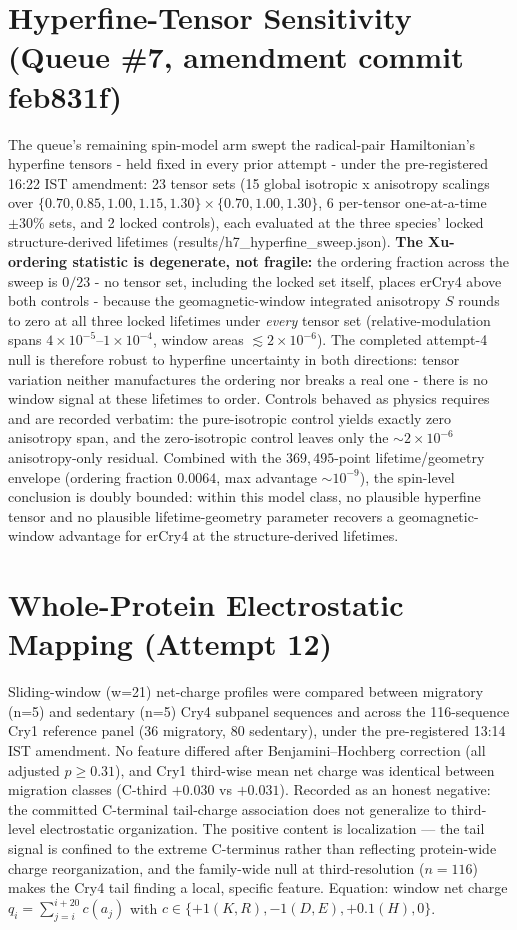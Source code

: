 \documentclass[12pt,a4paper]{article}
\begin{document}
\section{Hyperfine-Tensor Sensitivity (Queue \#7, amendment commit feb831f)}
The queue's remaining spin-model arm swept the radical-pair Hamiltonian's hyperfine tensors - held fixed in every prior attempt - under the pre-registered 16:22 IST amendment: 23 tensor sets (15 global isotropic x anisotropy scalings over $\{0.70, 0.85, 1.00, 1.15, 1.30\} \times \{0.70, 1.00, 1.30\}$, 6 per-tensor one-at-a-time $\pm 30\%$ sets, and 2 locked controls), each evaluated at the three species' locked structure-derived lifetimes (results/h7\_hyperfine\_sweep.json). \textbf{The Xu-ordering statistic is degenerate, not fragile:} the ordering fraction across the sweep is $0/23$ - no tensor set, including the locked set itself, places erCry4 above both controls - because the geomagnetic-window integrated anisotropy $S$ rounds to zero at all three locked lifetimes under \emph{every} tensor set (relative-modulation spans $4\times10^{-5}$--$1\times10^{-4}$, window areas $\lesssim 2\times10^{-6}$). The completed attempt-4 null is therefore robust to hyperfine uncertainty in both directions: tensor variation neither manufactures the ordering nor breaks a real one - there is no window signal at these lifetimes to order. Controls behaved as physics requires and are recorded verbatim: the pure-isotropic control yields exactly zero anisotropy span, and the zero-isotropic control leaves only the $\sim 2\times10^{-6}$ anisotropy-only residual. Combined with the $369{,}495$-point lifetime/geometry envelope (ordering fraction $0.0064$, max advantage $\sim 10^{-9}$), the spin-level conclusion is doubly bounded: within this model class, no plausible hyperfine tensor and no plausible lifetime-geometry parameter recovers a geomagnetic-window advantage for erCry4 at the structure-derived lifetimes.

\section{Whole-Protein Electrostatic Mapping (Attempt 12)}
Sliding-window (w=21) net-charge profiles were compared between migratory (n=5) and sedentary (n=5) Cry4 subpanel sequences and across the 116-sequence Cry1 reference panel (36 migratory, 80 sedentary), under the pre-registered 13:14 IST amendment. No feature differed after Benjamini--Hochberg correction (all adjusted $p \geq 0.31$), and Cry1 third-wise mean net charge was identical between migration classes (C-third $+0.030$ vs $+0.031$). Recorded as an honest negative: the committed C-terminal tail-charge association does not generalize to third-level electrostatic organization. The positive content is localization --- the tail signal is confined to the extreme C-terminus rather than reflecting protein-wide charge reorganization, and the family-wide null at third-resolution ($n=116$) makes the Cry4 tail finding a local, specific feature. Equation: window net charge $q_i = \sum_{j=i}^{i+20} c(a_j)$ with $c \in \{+1 (K,R), -1 (D,E), +0.1 (H), 0\}$.
\end{document}
